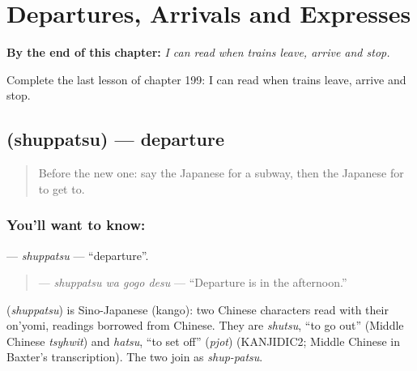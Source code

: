 
\chapter{Departures, Arrivals and Expresses}
\label{ch:ja-departures-arrivals-and-expresses}

\begin{chapteropening}
\textbf{By the end of this chapter:} \emph{I can read when trains leave, arrive and stop.}

Complete the last lesson of chapter 199: I can read when trains leave, arrive and stop.
\end{chapteropening}

\section[\texorpdfstring{\ja{しゅっぱつ} (shuppatsu)}{しゅっぱつ (shuppatsu)}]{ (shuppatsu) — departure}

\label{lesson:JA-C199-shuppatsu}



\begin{quote}
Before the new one: say the Japanese for a subway, then the Japanese for to get to.
\end{quote}

\subsection*{You'll want to know: }
\textbf{} — \emph{shuppatsu} — \textquotedblleft{}departure\textquotedblright{}.

\begin{quote}
\textbf{ } — \emph{shuppatsu wa gogo desu} — \textquotedblleft{}Departure is in the afternoon.\textquotedblright{}
\end{quote}

\begin{cousinweb}
\textbf{} (\emph{shuppatsu}) is Sino-Japanese (kango): two Chinese characters read with their on'yomi, readings borrowed from Chinese. They are \emph{shutsu}, \textquotedblleft{}to go out\textquotedblright{} (Middle Chinese \emph{tsyhwit}) and \emph{hatsu}, \textquotedblleft{}to set off\textquotedblright{} (\emph{pjot}) (KANJIDIC2; Middle Chinese in Baxter's transcription). The two join as \emph{shup-patsu}.
\end{cousinweb}

